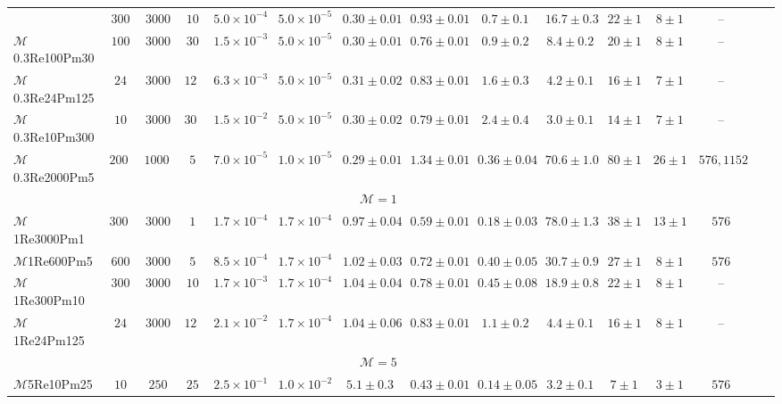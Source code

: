 \documentclass[12pt,twoside]{extreport}
\newcommand{\mSonicMach}{\ensuremath{\mathcal{M}}} %
\begin{document}
\begin{table}
{{\begin{threeparttable}
\begin{tabular}{l c c c c c c c c c c c c c c}
	& $300$ & $3000$ & $10$
	& $5.0 \times 10^{-4}$ & $5.0 \times 10^{-5}$ & $0.30 \pm 0.01$
	& $0.93 \pm 0.01$ & $0.7 \pm 0.1$
	& $16.7 \pm 0.3$ & $22 \pm 1$ & $8 \pm 1$
	& -- \\
$\mSonicMach$0.3Re100Pm30
	& $100$ & $3000$ & $30$
	& $1.5 \times 10^{-3}$ & $5.0 \times 10^{-5}$ & $0.30 \pm 0.01$
	& $0.76 \pm 0.01$ & $0.9 \pm 0.2$
	& $8.4 \pm 0.2$ & $20 \pm 1$ & $8 \pm 1$
	& -- \\
$\mSonicMach$0.3Re24Pm125
	& $24$ & $3000$ & $125$
	& $6.3 \times 10^{-3}$ & $5.0 \times 10^{-5}$ & $0.31 \pm 0.02$
	& $0.83 \pm 0.01$ & $1.6 \pm 0.3$
	& $4.2 \pm 0.1$ & $16 \pm 1$ & $7 \pm 1$
	& -- \\
$\mSonicMach$0.3Re10Pm300
	& $10$ & $3000$ & $300$
	& $1.5 \times 10^{-2}$ & $5.0 \times 10^{-5}$ & $0.30 \pm 0.02$
	& $0.79 \pm 0.01$ & $2.4 \pm 0.4$
	& $3.0 \pm 0.1$ & $14 \pm 1$ & $7 \pm 1$
	& -- \\
$\mSonicMach$0.3Re2000Pm5
	& $2000$ & $10000$ & $5$
	& $7.0 \times 10^{-5}$ & $1.0 \times 10^{-5}$ & $0.29 \pm 0.01$
	& $1.34 \pm 0.01$ & $0.36 \pm 0.04$
	& $70.6 \pm 1.0$ & $80 \pm 1$ & $26 \pm 1$
	& $576, 1152$ \\
\hline
\multicolumn{13}{c}{$\mSonicMach = 1$} \\
\hline
$\mSonicMach$1Re3000Pm1
	& $3000$ & $3000$ & $1$
	& $1.7 \times 10^{-4}$ & $1.7 \times 10^{-4}$ & $0.97 \pm 0.04$
	& $0.59 \pm 0.01$ & $0.18 \pm 0.03$
	& $78.0 \pm 1.3$ & $38 \pm 1$ & $13 \pm 1$
	& $576$ \\
$\mSonicMach$1Re600Pm5
	& $600$ & $3000$ & $5$
	& $8.5 \times 10^{-4}$ & $1.7 \times 10^{-4}$ & $1.02 \pm 0.03$
	& $0.72 \pm 0.01$ & $0.40 \pm 0.05$
	& $30.7 \pm 0.9$ & $27 \pm 1$ & $8 \pm 1$
	& $576$ \\
$\mSonicMach$1Re300Pm10
	& $300$ & $3000$ & $10$
	& $1.7 \times 10^{-3}$ & $1.7 \times 10^{-4}$ & $1.04 \pm 0.04$
	& $0.78 \pm 0.01$ & $0.45 \pm 0.08$
	& $18.9 \pm 0.8$ & $22 \pm 1$ & $8 \pm 1$
	& -- \\
$\mSonicMach$1Re24Pm125
	& $24$ & $3000$ & $125$
	& $2.1 \times 10^{-2}$ & $1.7 \times 10^{-4}$ & $1.04 \pm 0.06$
	& $0.83 \pm 0.01$ & $1.1 \pm 0.2$
	& $4.4 \pm 0.1$ & $16 \pm 1$ & $8 \pm 1$
	& -- \\
\hline
\multicolumn{13}{c}{$\mSonicMach = 5$} \\
\hline
$\mSonicMach$5Re10Pm25
	& $10$ & $250$ & $25$
	& $2.5 \times 10^{-1}$ & $1.0 \times 10^{-2}$ & $5.1 \pm 0.3$
	& $0.43 \pm 0.01$ & $0.14 \pm 0.05$
	& $3.2 \pm 0.1$ & $7 \pm 1$ & $3 \pm 1$
	& $576$ \\

\end{tabular}
\end{threeparttable}}}
\end{table}
\end{document}
